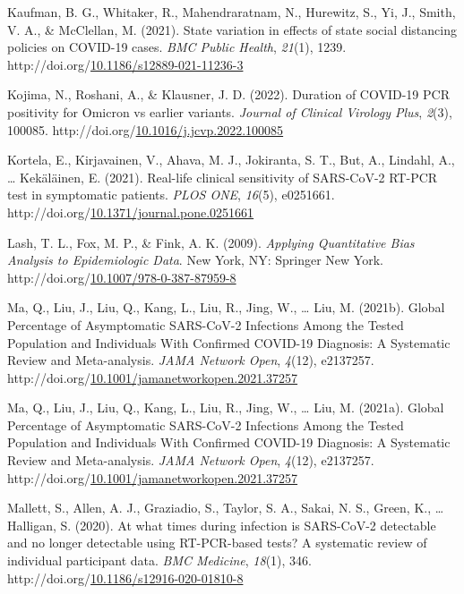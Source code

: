 \documentclass[12pt,twoside]{smiththesis}
\newlength{\cslhangindent}
\newenvironment{CSLReferences}[2] %
 {%
\setlength{\parindent}{0pt}
\ifodd #1 \everypar{\setlength{\hangindent}{\cslhangindent}}\ignorespaces\fi
\ifnum #2 > 0
\setlength{\parskip}{#2\baselineskip}
  \fi
}%
{}
\begin{document}
\begin{CSLReferences}{1}{0}
\leavevmode{}%
Kaufman, B. G., Whitaker, R., Mahendraratnam, N., Hurewitz, S., Yi, J., Smith, V. A., \& McClellan, M. (2021). State variation in effects of state social distancing policies on COVID-19 cases. \emph{BMC Public Health}, \emph{21}(1), 1239. http://doi.org/\href{https://doi.org/10.1186/s12889-021-11236-3}{10.1186/s12889-021-11236-3}

\leavevmode{}%
Kojima, N., Roshani, A., \& Klausner, J. D. (2022). Duration of COVID-19 PCR positivity for Omicron vs earlier variants. \emph{Journal of Clinical Virology Plus}, \emph{2}(3), 100085. http://doi.org/\href{https://doi.org/10.1016/j.jcvp.2022.100085}{10.1016/j.jcvp.2022.100085}

\leavevmode{}%
Kortela, E., Kirjavainen, V., Ahava, M. J., Jokiranta, S. T., But, A., Lindahl, A., \ldots{} Kekäläinen, E. (2021). Real-life clinical sensitivity of SARS-CoV-2 RT-PCR test in symptomatic patients. \emph{PLOS ONE}, \emph{16}(5), e0251661. http://doi.org/\href{https://doi.org/10.1371/journal.pone.0251661}{10.1371/journal.pone.0251661}

\leavevmode{}%
Lash, T. L., Fox, M. P., \& Fink, A. K. (2009). \emph{Applying Quantitative Bias Analysis to Epidemiologic Data}. New York, NY: Springer New York. http://doi.org/\href{https://doi.org/10.1007/978-0-387-87959-8}{10.1007/978-0-387-87959-8}

\leavevmode{}%
Ma, Q., Liu, J., Liu, Q., Kang, L., Liu, R., Jing, W., \ldots{} Liu, M. (2021b). Global Percentage of Asymptomatic SARS-CoV-2 Infections Among the Tested Population and Individuals With Confirmed COVID-19 Diagnosis: A Systematic Review and Meta-analysis. \emph{JAMA Network Open}, \emph{4}(12), e2137257. http://doi.org/\href{https://doi.org/10.1001/jamanetworkopen.2021.37257}{10.1001/jamanetworkopen.2021.37257}

\leavevmode{}%
Ma, Q., Liu, J., Liu, Q., Kang, L., Liu, R., Jing, W., \ldots{} Liu, M. (2021a). Global Percentage of Asymptomatic SARS-CoV-2 Infections Among the Tested Population and Individuals With Confirmed COVID-19 Diagnosis: A Systematic Review and Meta-analysis. \emph{JAMA Network Open}, \emph{4}(12), e2137257. http://doi.org/\href{https://doi.org/10.1001/jamanetworkopen.2021.37257}{10.1001/jamanetworkopen.2021.37257}

\leavevmode{}%
Mallett, S., Allen, A. J., Graziadio, S., Taylor, S. A., Sakai, N. S., Green, K., \ldots{} Halligan, S. (2020). At what times during infection is SARS-CoV-2 detectable and no longer detectable using RT-PCR-based tests? A systematic review of individual participant data. \emph{BMC Medicine}, \emph{18}(1), 346. http://doi.org/\href{https://doi.org/10.1186/s12916-020-01810-8}{10.1186/s12916-020-01810-8}


\end{CSLReferences}
\end{document}
